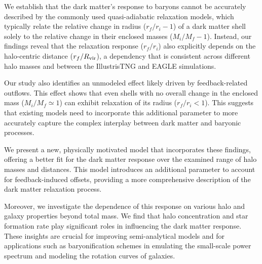 \documentclass[a4paper, 12pt, oneside]{Thesis}  %
\begin{document}
We establish that the dark matter's response to baryons cannot be accurately described by the commonly used quasi-adiabatic relaxation models, which typically relate the relative change in radius (\(r_f/r_i-1\)) of a dark matter shell solely to the relative change in their enclosed masses (\(M_i/M_f-1\)). Instead, our findings reveal that the relaxation response (\(r_f/r_i\)) also explicitly depends on the halo-centric distance (\(r_f/R_{\rm vir}\)), a dependency that is consistent across different halo masses and between the IllustrisTNG and EAGLE simulations.

Our study also identifies an unmodeled effect likely driven by feedback-related outflows. This effect shows that even shells with no overall change in the enclosed mass (\(M_i/M_f \simeq 1\))  can exhibit relaxation of its radius (\(r_f/r_i < 1\)). This suggests that existing models need to incorporate this additional parameter to more accurately capture the complex interplay between dark matter and baryonic processes.

We present a new, physically motivated model that incorporates these findings, offering a better fit for the dark matter response over the examined range of halo masses and distances. This model introduces an additional parameter to account for feedback-induced offsets, providing a more comprehensive description of the dark matter relaxation process.

Moreover, we investigate the dependence of this response on various halo and galaxy properties beyond total mass. We find that halo concentration and star formation rate play significant roles in influencing the dark matter response. These insights are crucial for improving semi-analytical models and for applications such as baryonification schemes in emulating the small-scale power spectrum and modeling the rotation curves of galaxies.
\end{document}
